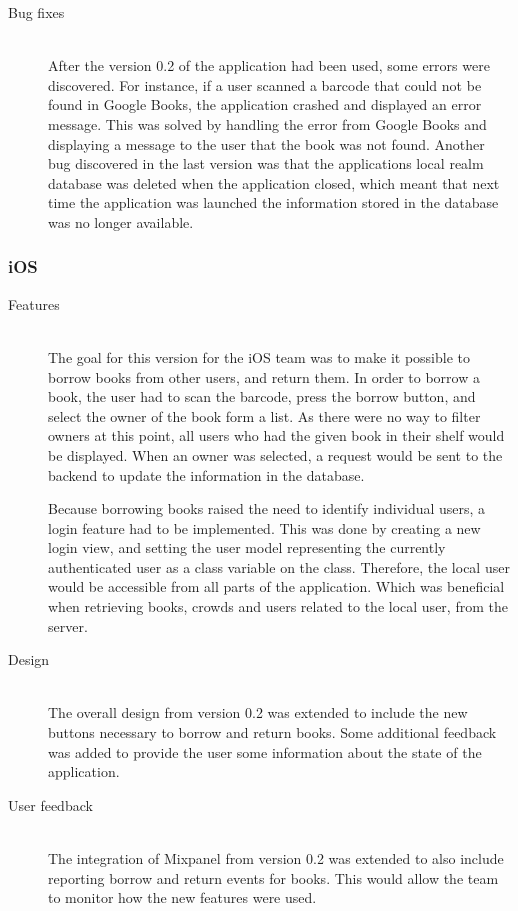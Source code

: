 \begin{description}
    \item[Bug fixes] \hfill\\
After the version 0.2 of the application had been used, some errors were discovered. For instance, if a user scanned a barcode that could not be found in Google Books, the application crashed and displayed an error message. This was solved by handling the error from Google Books and displaying a message to the user that the book was not found. Another bug discovered in the last version was that the applications local realm database was deleted when the application closed, which meant that next time the application was launched the information stored in the database was no longer available. 
\end{description}

\subsubsection{iOS}
\begin{description}
    \item[Features] \hfill\\
The goal for this version for the iOS team was to make it possible to borrow books from other users, and return them. In order to borrow a book, the user had to scan the barcode, press the borrow button, and select the owner of the book form a list. As there were no way to filter owners at this point, all users who had the given book in their shelf would be displayed. When an owner was selected, a request would be sent to the \gls{backend} to update the information in the database.

Because borrowing books raised the need to identify individual users, a login feature had to be implemented. This was done by creating a new login view, and setting the user model representing the currently authenticated user as a class variable on the  class. Therefore, the local user would be accessible from all parts of the application. Which was beneficial when retrieving books, crowds and users related to the local user, from the server.

    \item[Design] \hfill\\
The overall design from version 0.2 was extended to include the new buttons necessary to borrow and return books. Some additional feedback was added to provide the user some information about the state of the application.

    \item[User feedback] \hfill\\
The integration of Mixpanel from version 0.2 was extended to also include reporting borrow and return events for books. This would allow the team to monitor how the new features were used.
\end{description}

